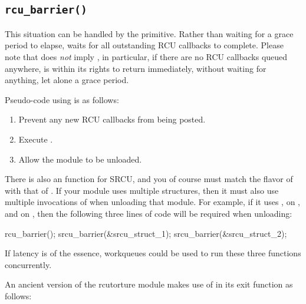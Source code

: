 \subsection{\texttt{rcu\_barrier()}}
\label{sec:rcu:rcu_barrier()}

This situation can be handled by the  primitive.
Rather
than waiting for a grace period to elapse,  waits for all
outstanding RCU callbacks to complete.
Please note that 
does \emph{not} imply , in particular, if there are no RCU
callbacks queued anywhere,  is within its rights to return
immediately, without waiting for anything, let alone a grace period.

Pseudo-code using  is as follows:

\begin{enumerate}
\item Prevent any new RCU callbacks from being posted.
\item Execute .
\item Allow the module to be unloaded.
\end{enumerate}

There is also an  function for SRCU, and you of course
must match the flavor of  with that of .
If your module uses multiple  structures, then it must also
use multiple invocations of  when unloading that module.
For example, if it uses ,  on , and
 on , then the following three lines of code
will be required when unloading:

\begin{VerbatimN}
  rcu_barrier();
  srcu_barrier(&srcu_struct_1);
  srcu_barrier(&srcu_struct_2);
\end{VerbatimN}

If latency is of the essence, workqueues could be used to run these
three functions concurrently.

An ancient version of the rcutorture module makes use of 
in its exit function as follows:

